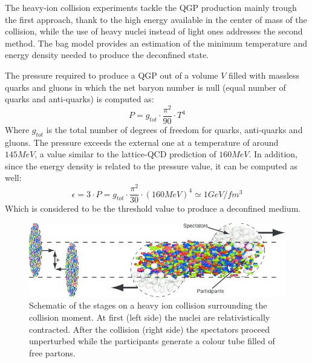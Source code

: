The heavy-ion collision experiments tackle the QGP production mainly trough the first approach, thank to the high energy available in the center of mass of the collision, while the use of heavy nuclei instead of light ones addresses the second method.
The bag model provides an estimation of the minimum temperature and energy density needed to produce the deconfined state.

The pressure required to produce a QGP out of a volume $V$ filled with massless quarks and gluons in which the net baryon number is null (equal number of quarks and anti-quarks) is computed as:
\begin{equation}
P = g_{tot}\cdot\frac{\pi^2}{90}\cdot T^4
\end{equation}
Where $g_{tot}$ is the total number of degrees of freedom for quarks, anti-quarks and gluons.
The pressure exceeds the external one at a temperature of around $145MeV$, a value similar to the lattice-QCD prediction of $160MeV$.
In addition, since the energy density is related to the pressure value, it can be computed as well:
\begin{equation}
\epsilon = 3\cdot P = g_{tot}\cdot\frac{\pi^2}{30}\cdot (160MeV)^4 \simeq 1 GeV/fm^3
\end{equation}
Which is considered to be the threshold value to produce a deconfined medium.

\begin{figure}[!ht]
\begin{center}
\includegraphics[width=0.99\linewidth]{Chapters/Introduction/Figs/collision.jpg}
\caption{Schematic of the stages on a heavy ion collision surrounding the collision moment. At first (left side) the nuclei are relativistically contracted. After the collision (right side) the spectators proceed unperturbed while the participants generate a colour tube filled of free partons.}
\label{fig:collision}
\end{center}
\end{figure}

